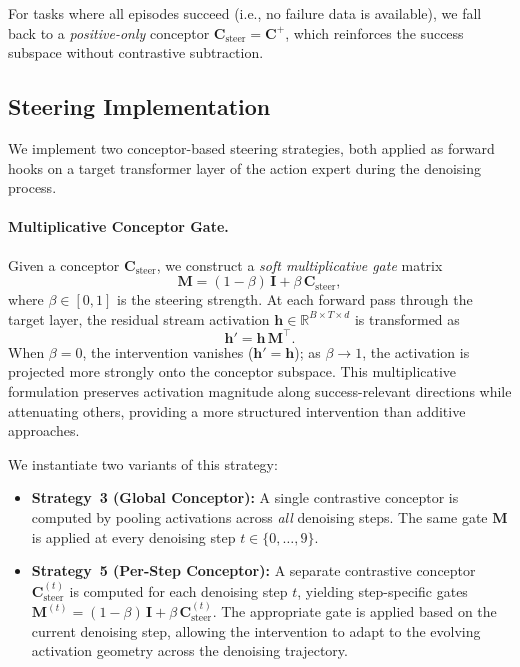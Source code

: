 For tasks where all episodes succeed (i.e., no failure data is available), we fall back to a \emph{positive-only} conceptor $\mathbf{C}_{\text{steer}} = \mathbf{C}^{+}$, which reinforces the success subspace without contrastive subtraction.


\subsection{Steering Implementation}
\label{sec:steering}

We implement two conceptor-based steering strategies, both applied as forward hooks on a target transformer layer of the action expert during the denoising process.

\paragraph{Multiplicative Conceptor Gate.}
Given a conceptor $\mathbf{C}_{\text{steer}}$, we construct a \emph{soft multiplicative gate} matrix
\begin{equation}
    \mathbf{M} = (1 - \beta)\, \mathbf{I} + \beta\, \mathbf{C}_{\text{steer}},
    \label{eq:gate}
\end{equation}
where $\beta \in [0, 1]$ is the steering strength. At each forward pass through the target layer, the residual stream activation $\mathbf{h} \in \mathbb{R}^{B \times T \times d}$ is transformed as
\begin{equation}
    \mathbf{h}' = \mathbf{h}\, \mathbf{M}^\top.
    \label{eq:steer_apply}
\end{equation}
When $\beta = 0$, the intervention vanishes ($\mathbf{h}' = \mathbf{h}$); as $\beta \to 1$, the activation is projected more strongly onto the conceptor subspace. This multiplicative formulation preserves activation magnitude along success-relevant directions while attenuating others, providing a more structured intervention than additive approaches.

We instantiate two variants of this strategy:
\begin{itemize}
    \item \textbf{Strategy~3 (Global Conceptor):} A single contrastive conceptor is computed by pooling activations across \emph{all} denoising steps. The same gate $\mathbf{M}$ is applied at every denoising step $t \in \{0, \ldots, 9\}$.
    \item \textbf{Strategy~5 (Per-Step Conceptor):} A separate contrastive conceptor $\mathbf{C}_{\text{steer}}^{(t)}$ is computed for each denoising step $t$, yielding step-specific gates $\mathbf{M}^{(t)} = (1 - \beta)\,\mathbf{I} + \beta\,\mathbf{C}_{\text{steer}}^{(t)}$. The appropriate gate is applied based on the current denoising step, allowing the intervention to adapt to the evolving activation geometry across the denoising trajectory.
\end{itemize}


